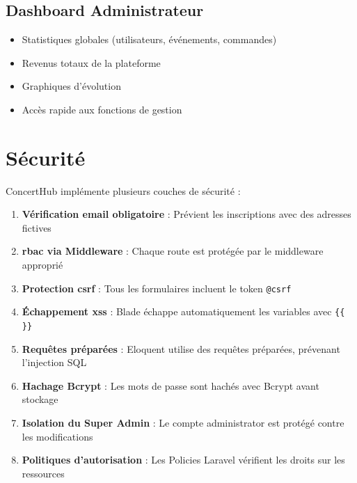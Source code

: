 \documentclass[a4paper,12pt,twoside]{report}
\begin{document}
\subsection{Dashboard Administrateur}
\begin{itemize}
    \item Statistiques globales (utilisateurs, événements, commandes)
    \item Revenus totaux de la plateforme
    \item Graphiques d'évolution
    \item Accès rapide aux fonctions de gestion
\end{itemize}

\section{Sécurité}

ConcertHub implémente plusieurs couches de sécurité :

\begin{enumerate}
    \item \textbf{Vérification email obligatoire} : Prévient les inscriptions avec des adresses fictives
    
    \item \textbf{\gls{rbac} via Middleware} : Chaque route est protégée par le middleware approprié
    
    \item \textbf{Protection \gls{csrf}} : Tous les formulaires incluent le token \texttt{@csrf}
    
    \item \textbf{Échappement \gls{xss}} : Blade échappe automatiquement les variables avec \texttt{\{\{ \}\}}
    
    \item \textbf{Requêtes préparées} : Eloquent utilise des requêtes préparées, prévenant l'injection SQL
    
    \item \textbf{Hachage Bcrypt} : Les mots de passe sont hachés avec Bcrypt avant stockage
    
    \item \textbf{Isolation du Super Admin} : Le compte administrator est protégé contre les modifications
    
    \item \textbf{Politiques d'autorisation} : Les Policies Laravel vérifient les droits sur les ressources
\end{enumerate}
\end{document}

